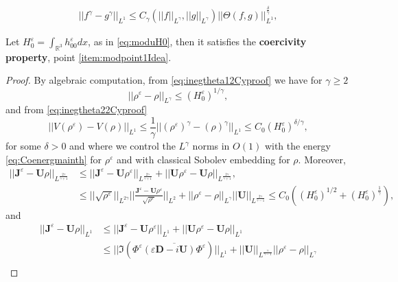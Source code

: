 \documentclass[10pt,a4paper]{amsart}
\begin{document}
\begin{align}
\label{eq:inegtheta22Cyproof}
    ||f^\gamma-g^\gamma||_{L^1}\leq C_\gamma(||f||_{L^{\gamma}},||g||_{L^{\gamma}})||\Theta(f,g)||^{\frac{\delta}{\gamma}}_{L^1},
\end{align}

\begin{propal}
\label{propal:tryoneh00Cyproof}
    Let $H^\varepsilon_0=\int_{\mathbb{R}^3}{h_{00}^\varepsilon dx}$, as in \eqref{eq:moduH0}, then it satisfies the \textbf{coercivity property}, point \ref{item:modpoint1Idea}.
\end{propal}

\begin{proof}
    By algebraic computation, from
  \eqref{eq:inegtheta12Cyproof} we have for $\gamma\geq2$ 
\begin{equation}
\label{eq:convtheta1osefCyproof}
    ||\rho^\varepsilon-\rho||_{L^\gamma}\leq (H^\varepsilon_0)^{1/\gamma},
\end{equation}
and from \eqref{eq:inegtheta22Cyproof}
\begin{equation}
\label{eq:convtheta2osefCyproof}
    ||V(\rho^\varepsilon)-V(\rho)||_{L^1}\leq\frac{1}{\gamma}||(\rho^\varepsilon)^\gamma-(\rho)^\gamma||_{L^1}\leq C_0(H^\varepsilon_0)^{\delta/\gamma},
\end{equation}
for some $\delta>0$ and where we control the $L^\gamma$ norms in $O(1)$ with the energy \eqref{eq:Coenergmainth} for $\rho^\varepsilon$ and with classical Sobolev embedding for $\rho$. Moreover,
\begin{align*}
     ||\textbf{J}^\varepsilon-\textbf{U}\rho||_{L^{\frac{2\gamma}{\gamma+1}}}&\leq  ||\textbf{J}^\varepsilon-\textbf{U}\rho^\varepsilon||_{L^{\frac{2\gamma}{\gamma+1}}}+||\textbf{U}\rho^\varepsilon-\textbf{U}\rho||_{L^{\frac{2\gamma}{\gamma+1}}},\\
     &\leq||\sqrt{\rho^\varepsilon}||_{L^{2\gamma}}||\frac{\textbf{J}^\varepsilon-\textbf{U}\rho^\varepsilon}{\sqrt{\rho^\varepsilon}}||_{L^{2}}+||\rho^\varepsilon-\rho||_{L^{\gamma}}||\textbf{U}||_{L^{\frac{2\gamma}{\gamma-1}}}\leq C_0((H^\varepsilon_0)^{1/2}+(H^\varepsilon_0)^{\frac{1}{\gamma}}),
\end{align*}
and
\begin{align*}
     ||\textbf{J}^\varepsilon-\textbf{U}\rho||_{L^1}&\leq  ||\textbf{J}^\varepsilon-\textbf{U}\rho^\varepsilon||_{L^{1}}+||\textbf{U}\rho^\varepsilon-\textbf{U}\rho||_{L^{1}}\\    &\leq||\Im(\Phi^\varepsilon\overline{(\varepsilon\textbf{D}-i\textbf{U})\Phi^\varepsilon})||_{L^{1}}+||\textbf{U}||_{L^{\frac{\gamma}{\gamma-1}}}||\rho^\varepsilon-\rho||_{L^{\gamma}} \\

\end{align*}
\end{proof}
\end{document}
